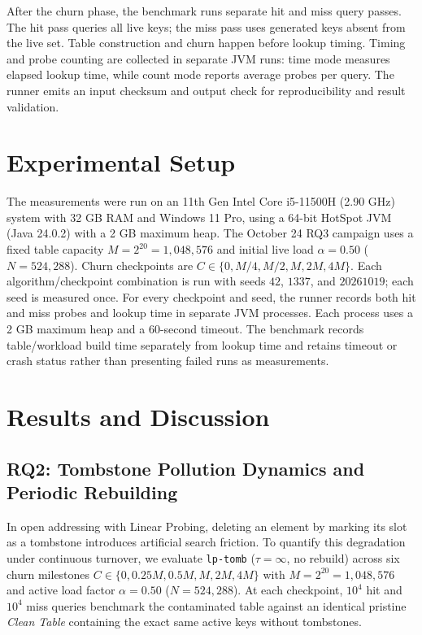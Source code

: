 \documentclass[conference]{IEEEtran}
\begin{document}
After the churn phase, the benchmark runs separate hit and miss query passes.
The hit pass queries all live keys; the miss pass uses generated keys absent
from the live set. Table construction and churn happen before lookup timing.
Timing and probe counting are collected in separate JVM runs: time mode
measures elapsed lookup time, while count mode reports average probes per
query. The runner emits an input checksum and output check for reproducibility
and result validation.

\section{Experimental Setup}
The measurements were run on an 11th Gen Intel Core i5-11500H (2.90 GHz)
system with 32 GB RAM and Windows 11 Pro, using a 64-bit HotSpot JVM
(Java 24.0.2) with a 2 GB maximum heap. The October 24 RQ3 campaign uses a fixed table capacity
$M=2^{20}=1,048,576$ and initial live load $\alpha=0.50$
($N=524,288$). Churn checkpoints are
$C\in\{0, M/4, M/2, M, 2M, 4M\}$. Each algorithm/checkpoint combination is
run with seeds $42$, $1337$, and $20261019$; each seed is measured once.
For every checkpoint and seed, the runner records both hit and miss probes
and lookup time in separate JVM processes. Each process uses a 2 GB maximum
heap and a 60-second timeout. The benchmark records table/workload build time
separately from lookup time and retains timeout or crash status rather than
presenting failed runs as measurements.

\section{Results and Discussion}
\subsection{RQ2: Tombstone Pollution Dynamics and Periodic Rebuilding}
In open addressing with Linear Probing, deleting an element by marking its slot as a tombstone introduces artificial search friction. To quantify this degradation under continuous turnover, we evaluate \texttt{lp-tomb} ($\tau = \infty$, no rebuild) across six churn milestones $C \in \{0, 0.25M, 0.5M, M, 2M, 4M\}$ with $M = 2^{20} = 1,048,576$ and active load factor $\alpha = 0.50$ ($N = 524,288$). At each checkpoint, $10^4$ hit and $10^4$ miss queries benchmark the contaminated table against an identical pristine \textit{Clean Table} containing the exact same active keys without tombstones.
\end{document}
